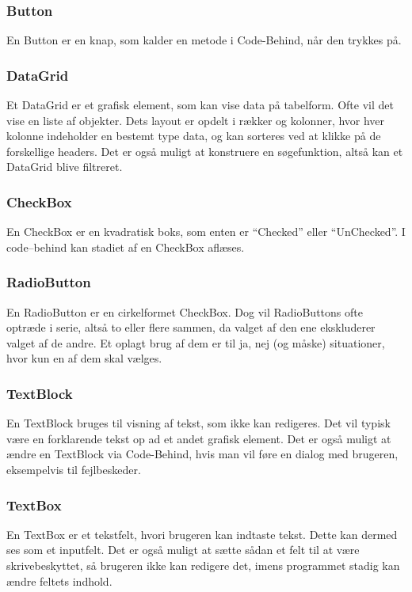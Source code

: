 \subsubsection*{Button}
En Button er en knap, som kalder en metode i Code-Behind, når den trykkes på.

\subsubsection*{DataGrid}
Et DataGrid er et grafisk element, som kan vise data på tabelform.
Ofte vil det vise en liste af objekter.
Dets layout er opdelt i rækker og kolonner, hvor hver kolonne indeholder en bestemt type data, og kan sorteres ved at klikke på de forskellige headers.
Det er også muligt at konstruere en søgefunktion, altså kan et DataGrid blive filtreret.

\subsubsection*{CheckBox}
En CheckBox er en kvadratisk boks, som enten er ``Checked'' eller ``UnChecked''.
I code--behind kan stadiet af en CheckBox aflæses.

\subsubsection*{RadioButton}
En RadioButton er en cirkelformet CheckBox.
Dog vil RadioButtons ofte optræde i serie, altså to eller flere sammen, da valget af den ene ekskluderer valget af de andre. 
Et oplagt brug af dem er til ja, nej (og måske) situationer, hvor kun en af dem skal vælges.

\subsubsection*{TextBlock}
En TextBlock bruges til visning af tekst, som ikke kan redigeres.
Det vil typisk være en forklarende tekst op ad et andet grafisk element.
Det er også muligt at ændre en TextBlock via Code-Behind, hvis man vil føre en dialog med brugeren, eksempelvis til fejlbeskeder.

\subsubsection*{TextBox}
En TextBox er et tekstfelt, hvori brugeren kan indtaste tekst. 
Dette kan dermed ses som et inputfelt. 
Det er også muligt at sætte sådan et felt til at være skrivebeskyttet, så brugeren ikke kan redigere det, imens programmet stadig kan ændre feltets indhold.

